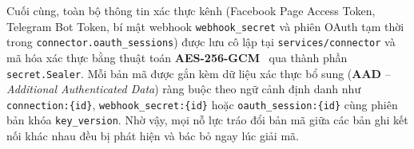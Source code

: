 Cuối cùng, toàn bộ thông tin xác thực kênh (Facebook Page Access Token, Telegram Bot Token, bí mật webhook \texttt{webhook\_\hspace{0pt}secret} và phiên OAuth tạm thời trong
\texttt{connector.\hspace{0pt}oauth\_\hspace{0pt}sessions}) được lưu cô lập tại \texttt{services/\hspace{0pt}connector} và mã hóa xác thực bằng thuật toán \textbf{AES-256-GCM}~\cite{nist80038d} qua thành phần \texttt{secret.\hspace{0pt}Sealer}. Mỗi bản mã được
gắn kèm dữ liệu xác thực bổ sung (\textbf{AAD} -- \emph{Additional Authenticated Data}) ràng buộc theo ngữ cảnh định danh như \texttt{connection:\hspace{0pt}\{id\}}, \texttt{webhook\_\hspace{0pt}secret:\hspace{0pt}\{id\}} hoặc
\texttt{oauth\_\hspace{0pt}session:\hspace{0pt}\{id\}} cùng phiên bản khóa \texttt{key\_\hspace{0pt}version}. Nhờ vậy, mọi nỗ lực tráo đổi bản mã giữa các bản ghi kết nối khác nhau đều bị phát hiện và bác bỏ ngay lúc giải mã.
